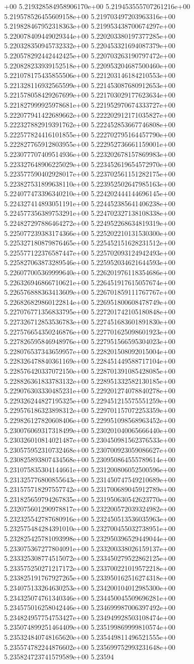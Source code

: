 +00	5.219328584958906170e+00	5.219453555707261216e+00	5.219578526455609158e+00	5.219703497203963316e+00	5.219828467952318363e+00	5.219953438700674297e+00	5.220078409449029344e+00	5.220203380197377285e+00	5.220328350945732332e+00	5.220453321694087379e+00	5.220578292442442425e+00	5.220703263190797472e+00	5.220828233939152518e+00	5.220953204687500460e+00	5.221078175435855506e+00	5.221203146184210553e+00	5.221328116932565599e+00	5.221453087680912653e+00	5.221578058429267699e+00	5.221703029177623634e+00	5.221827999925978681e+00	5.221952970674333727e+00	5.222077941422689662e+00	5.222202912171035827e+00	5.222327882919391762e+00	5.222452853667746808e+00	5.222577824416101855e+00	5.222702795164457790e+00	5.222827765912803955e+00	5.222952736661159001e+00	5.223077707409514936e+00	5.223202678157869983e+00	5.223327648906225029e+00	5.223452619654572970e+00	5.223577590402928017e+00	5.223702561151282175e+00	5.223827531899638110e+00	5.223952502647985163e+00	5.224077473396340210e+00	5.224202444144696145e+00	5.224327414893051191e+00	5.224452385641406238e+00	5.224577356389753291e+00	5.224702327138108338e+00	5.224827297886464272e+00	5.224952268634819319e+00	5.225077239383174366e+00	5.225202210131530300e+00	5.225327180879876465e+00	5.225452151628231512e+00	5.225577122376587447e+00	5.225702093124942493e+00	5.225827063873289546e+00	5.225952034621644593e+00	5.226077005369999640e+00	5.226201976118354686e+00	5.226326946866710621e+00	5.226451917615057674e+00	5.226576888363413609e+00	5.226701859111767767e+00	5.226826829860122814e+00	5.226951800608478749e+00	5.227076771356833795e+00	5.227201742105180848e+00	5.227326712853536783e+00	5.227451683601891830e+00	5.227576654350246876e+00	5.227701625098601923e+00	5.227826595846948976e+00	5.227951566595304023e+00	5.228076537343659957e+00	5.228201508092015004e+00	5.228326478840361169e+00	5.228451449588717104e+00	5.228576420337072150e+00	5.228701391085428085e+00	5.228826361833783132e+00	5.228951332582130185e+00	5.229076303330485231e+00	5.229201274078840278e+00	5.229326244827195325e+00	5.229451215575551259e+00	5.229576186323898312e+00	5.229701157072253359e+00	5.229826127820608406e+00	5.229951098568963452e+00	5.230076069317318499e+00	5.230201040065666440e+00	5.230326010814021487e+00	5.230450981562376533e+00	5.230575952310732468e+00	5.230700923059086627e+00	5.230825893807434568e+00	5.230950864555789614e+00	5.231075835304144661e+00	5.231200806052500596e+00	5.231325776800855643e+00	5.231450747549210689e+00	5.231575718297557742e+00	5.231700689045912789e+00	5.231825659794267835e+00	5.231950630542623770e+00	5.232075601290978817e+00	5.232200572039324982e+00	5.232325542787680916e+00	5.232450513536035963e+00	5.232575484284391010e+00	5.232700455032738951e+00	5.232825425781093998e+00	5.232950396529449044e+00	5.233075367277804091e+00	5.233200338026159137e+00	5.233325308774515072e+00	5.233450279522862125e+00	5.233575250271217172e+00	5.233700221019572218e+00	5.233825191767927265e+00	5.233950162516274318e+00	5.234075133264630253e+00	5.234200104012985300e+00	5.234325074761340346e+00	5.234450045509696281e+00	5.234575016258042446e+00	5.234699987006397492e+00	5.234824957754753427e+00	5.234949928503108474e+00	5.235074899251464409e+00	5.235199869999810574e+00	5.235324840748165620e+00	5.235449811496521555e+00	5.235574782244876602e+00	5.235699752993231648e+00	5.235824723741579589e+00	5.23594